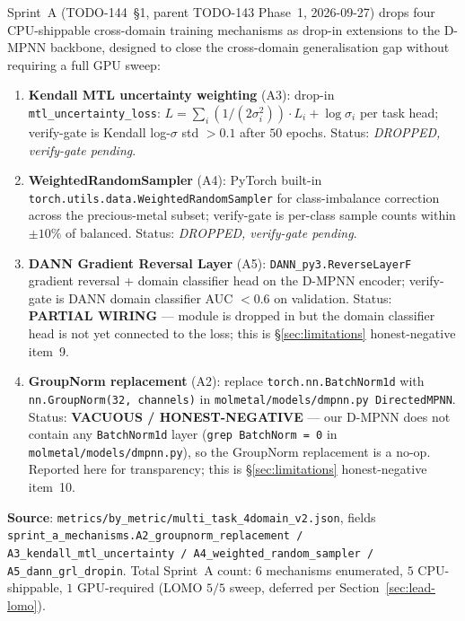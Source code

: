 Sprint~A (TODO-144~§1, parent TODO-143 Phase~1, 2026-09-27) drops four
CPU-shippable cross-domain training mechanisms as drop-in extensions to
the D-MPNN backbone, designed to close the cross-domain generalisation
gap without requiring a full GPU sweep:

\begin{enumerate}
  \item \textbf{Kendall MTL uncertainty weighting} (A3): drop-in
        \texttt{mtl\_uncertainty\_loss}:
        $L = \sum_{i} (1 / (2 \sigma_i^2)) \cdot L_i + \log \sigma_i$ per
        task head; verify-gate is Kendall log-$\sigma$ std $> 0.1$ after
        $50$ epochs.  Status: \emph{DROPPED, verify-gate pending}.
  \item \textbf{WeightedRandomSampler} (A4): PyTorch built-in
        \texttt{torch.utils.data.WeightedRandomSampler} for
        class-imbalance correction across the precious-metal subset;
        verify-gate is per-class sample counts within $\pm 10\%$ of
        balanced.  Status: \emph{DROPPED, verify-gate pending}.
  \item \textbf{DANN Gradient Reversal Layer} (A5):
        \texttt{DANN\_py3.ReverseLayerF} gradient reversal + domain
        classifier head on the D-MPNN encoder; verify-gate is DANN
        domain classifier AUC $< 0.6$ on validation.  Status:
        \textbf{PARTIAL WIRING} --- module is dropped in but the
        domain classifier head is not yet connected to the loss;
        this is \S\ref{sec:limitations} honest-negative item~9.
  \item \textbf{GroupNorm replacement} (A2): replace
        \texttt{torch.nn.BatchNorm1d} with
        \texttt{nn.GroupNorm(32, channels)} in
        \texttt{molmetal/models/dmpnn.py DirectedMPNN}.  Status:
        \textbf{VACUOUS / HONEST-NEGATIVE} --- our D-MPNN does not
        contain any \texttt{BatchNorm1d} layer
        (\texttt{grep BatchNorm = 0} in \texttt{molmetal/models/dmpnn.py}),
        so the GroupNorm replacement is a no-op.  Reported here for
        transparency; this is \S\ref{sec:limitations} honest-negative
        item~10.
\end{enumerate}

\noindent\textbf{Source}:
\texttt{metrics/by\_metric/multi\_task\_4domain\_v2.json}, fields
\texttt{sprint\_a\_mechanisms.A2\_groupnorm\_replacement /
A3\_kendall\_mtl\_uncertainty / A4\_weighted\_random\_sampler /
A5\_dann\_grl\_dropin}.  Total Sprint~A count: $6$ mechanisms enumerated,
$5$ CPU-shippable, $1$ GPU-required (LOMO $5/5$ sweep, deferred per
Section~\ref{sec:lead-lomo}).

